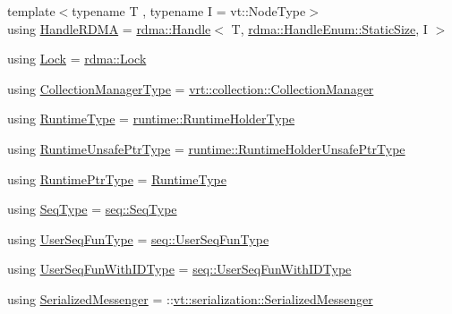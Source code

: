 \begin{DoxyCompactItemize}
\item 
{\footnotesize template$<$typename T , typename I  = vt\+::\+Node\+Type$>$ }\\using \hyperlink{namespacevt_abc3449a4b87363b942453d0b8cc18a7d}{Handle\+R\+D\+MA} = \hyperlink{structvt_1_1rdma_1_1_handle}{rdma\+::\+Handle}$<$ T, \hyperlink{namespacevt_1_1rdma_a0234ff19cfb3c04718cfdfd36b2d6d88a0c5c41d6a0319a61d3a5e8a060b7c4d7}{rdma\+::\+Handle\+Enum\+::\+Static\+Size}, I $>$
\item 
using \hyperlink{namespacevt_ae3eb725d1ffe20cd7d82a8c42f3e52ef}{Lock} = \hyperlink{namespacevt_1_1rdma_ac5c20b41a653e520b6305d4d454ecb70}{rdma\+::\+Lock}
\item 
using \hyperlink{namespacevt_a290f7e8941f9f411b54cdb15b6cea107}{Collection\+Manager\+Type} = \hyperlink{structvt_1_1vrt_1_1collection_1_1_collection_manager}{vrt\+::collection\+::\+Collection\+Manager}
\item 
using \hyperlink{namespacevt_a5c1db2c048b259a2ba8961766ddb9278}{Runtime\+Type} = \hyperlink{namespacevt_1_1runtime_ab09d044cce417fbcdb7e1e29b7aabbc3}{runtime\+::\+Runtime\+Holder\+Type}
\item 
using \hyperlink{namespacevt_a8019b70cc4b9b0833c38559c85dfd53b}{Runtime\+Unsafe\+Ptr\+Type} = \hyperlink{namespacevt_1_1runtime_a69931905b04961a874e4a70a43083a83}{runtime\+::\+Runtime\+Holder\+Unsafe\+Ptr\+Type}
\item 
using \hyperlink{namespacevt_a0ce60e0299d8fa32223b3b9ffa0af466}{Runtime\+Ptr\+Type} = \hyperlink{namespacevt_a5c1db2c048b259a2ba8961766ddb9278}{Runtime\+Type}
\item 
using \hyperlink{namespacevt_a98ecd5e376bd317a21b245064361240e}{Seq\+Type} = \hyperlink{namespacevt_1_1seq_a3b612da217ac669d39c159f134ab8434}{seq\+::\+Seq\+Type}
\item 
using \hyperlink{namespacevt_affe11140b7cc6953030f1f158b40750c}{User\+Seq\+Fun\+Type} = \hyperlink{namespacevt_1_1seq_aeb4674d25dcb5d27248b68ec83fad2b6}{seq\+::\+User\+Seq\+Fun\+Type}
\item 
using \hyperlink{namespacevt_a3170103960b4d8f8a0f722750bc0dcc9}{User\+Seq\+Fun\+With\+I\+D\+Type} = \hyperlink{namespacevt_1_1seq_a1a58d0ebe1d6bbed8438607a9c717779}{seq\+::\+User\+Seq\+Fun\+With\+I\+D\+Type}
\item 
using \hyperlink{namespacevt_a490b7af99bdeb06e988d94a7ab389b43}{Serialized\+Messenger} = \+::\hyperlink{structvt_1_1serialization_1_1_serialized_messenger}{vt\+::serialization\+::\+Serialized\+Messenger}
\item 

\end{DoxyCompactItemize}

